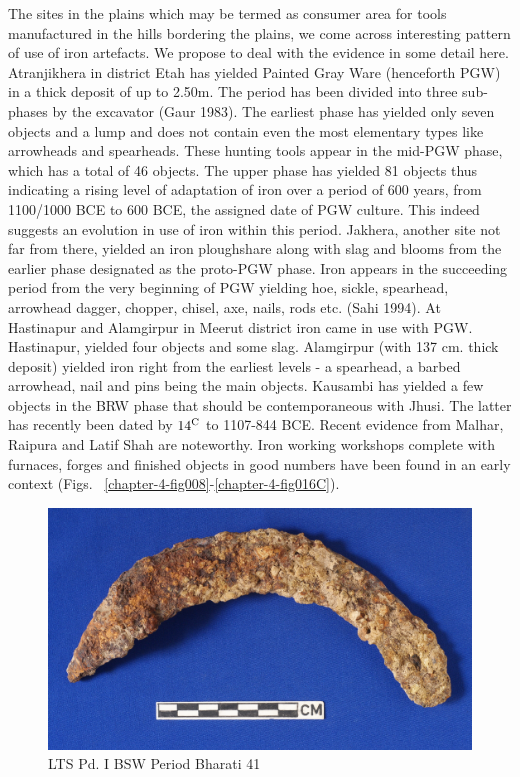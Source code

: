 The sites in the plains which may be termed as consumer area for tools manufactured in the hills bordering the plains, we come across interesting pattern of use of iron artefacts. We propose to deal with the evidence in some detail here. Atranjikhera in district Etah has yielded Painted Gray Ware (henceforth PGW) in a thick deposit of up to 2.50m. The period has been divided into three sub-phases by the excavator (Gaur 1983). The earliest phase has yielded only seven objects and a lump and does not contain even the most elementary types like arrowheads and spearheads. These hunting tools appear in the mid-PGW phase, which has a total of 46 objects. The upper phase has yielded 81 objects thus indicating a rising level of adaptation of iron over a period of 600 years, from 1100/1000 BCE to 600 BCE, the assigned date of PGW culture. This indeed suggests an evolution in use of iron within this period. Jakhera, another site not far from there, yielded an iron ploughshare along with slag and blooms from the earlier phase designated as the proto-PGW phase. Iron appears in the succeeding period from the very beginning of PGW yielding hoe, sickle, spearhead, arrowhead dagger, chopper, chisel, axe, nails, rods etc. (Sahi 1994). At Hastinapur and Alamgirpur in Meerut district iron came in use with PGW. Hastinapur, yielded four objects and some slag. Alamgirpur (with 137 cm. thick deposit) yielded iron right from the earliest levels - a spearhead, a barbed arrowhead, nail and pins being the main objects. Kausambi has yielded a few objects in the BRW phase that should be contemporaneous with Jhusi. The latter has recently been dated by $14^{\rm C}$ to 1107-844 BCE. Recent evidence from Malhar, Raipura and Latif Shah are noteworthy. Iron working workshops complete with furnaces, forges and finished objects in good numbers have been found in an early context (Figs.~ \ref{chapter-4-fig008}-\ref{chapter-4-fig016C}).

\begin{figure}[H]
\includegraphics[scale=0.4]{images/chapter-4/fig011.jpg}
\caption{LTS Pd. I BSW Period Bharati 41}\label{chapter-4-fig11}
\end{figure}

